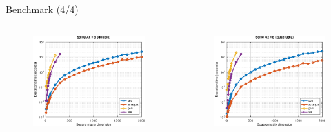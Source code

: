 \begin{frame}{Benchmark (4/4)}

\begin{columns}
\begin{column}{0.3\textwidth}
\begin{figure}
\centering
\includegraphics[width=1.0\linewidth]{res/data/2021-11-24_run-01-lin-double-semilogy}
\end{figure}
\end{column}
\begin{column}{0.3\textwidth}
\begin{figure}
\centering
\includegraphics[width=1.0\linewidth]{res/data/2021-11-24_run-01-lin-quadruple-semilogy}

\end{figure}
\end{column}
\end{columns}
\end{frame}
